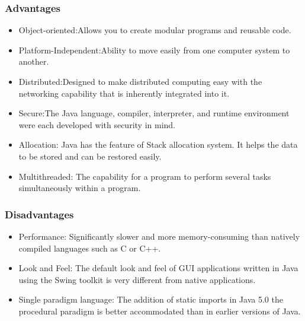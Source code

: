 \documentclass[a4paper, hidelinks, 12pt]{report}
\begin{document}
	\subsubsection{Advantages}
	\begin{itemize}
	\item{Object-oriented}:Allows you to create modular programs and reusable code. 
	\item{Platform-Independent}:Ability to move easily from one computer system to another. 
		\item{Distributed}:Designed to make distributed computing easy with the networking capability that is inherently integrated into it.
		\item{Secure}:The Java language, compiler, interpreter, and runtime environment were each developed with security in mind.
		\item{Allocation}: Java has the feature of Stack allocation system. It helps the data to be stored and can be restored easily.
		\item{Multithreaded}: The capability for a program to perform several tasks simultaneously within a program.
	\end{itemize}
	\subsubsection{Disadvantages}
	\begin{itemize}
	\item{Performance}: Significantly slower and more memory-consuming than natively compiled languages such as C or C++.
	\item{Look and Feel}: The default look and feel of GUI applications written in Java using the Swing toolkit is very different from native applications.
		\item{Single paradigm language}: The addition of static imports in Java 5.0 the procedural paradigm is better accommodated than in earlier versions of Java.
	\end{itemize}
	
 
\end{document}

